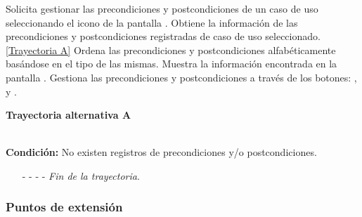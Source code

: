 \begin{UCtrayectoria}
	\UCpaso[\UCactor] Solicita gestionar las precondiciones y postcondiciones de un caso de uso seleccionando el icono  de la pantalla .
	\UCpaso[\UCsist] Obtiene la información de las precondiciones y postcondiciones registradas de caso de uso seleccionado. \hyperlink{CU12-1-2:TAA}{[Trayectoria A]}
	\UCpaso[\UCsist] Ordena las precondiciones y postcondiciones alfabéticamente basándose en el tipo de las mismas.
	\UCpaso[\UCsist] Muestra la información encontrada en la pantalla . \label{CU12-1-2-P4}
	\UCpaso[\UCactor] Gestiona las precondiciones y postcondiciones a través de los botones: , \editar y \eliminar. 
\end{UCtrayectoria}		
\hypertarget{CU12-1-2:TAA}{\textbf{Trayectoria alternativa A}}\\
\noindent \textbf{Condición:} No existen registros de precondiciones y/o postcondiciones.
\begin{enumerate}
	\UCpaso[\UCsist] Muestra el mensaje  en la pantalla  para indicar que no hay registros para mostrar.  \label{CU12-1-2-TA1}
	\UCpaso[\UCactor] Gestiona las precondiciones y postcondiciones a través del botón: . 
	\item[- -] - - {\em {Fin de la trayectoria}}.%
\end{enumerate}
\subsubsection{Puntos de extensión}

